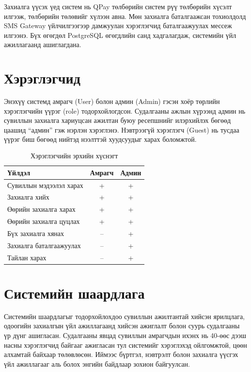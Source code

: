 Захиалга үүсэх үед систем нь QPay төлбөрийн систем рүү төлбөрийн хүсэлт илгээж, төлбөрийн төлөвийг хүлээн авна. Мөн захиалга баталгаажсан тохиолдолд SMS Gateway үйлчилгээгээр дамжуулан хэрэглэгчид баталгаажуулах мессеж илгээнэ. Бүх өгөгдөл PostgreSQL өгөгдлийн санд хадгалагдаж, системийн үйл ажиллагаанд ашиглагдана.


\section{Хэрэглэгчид}

Энэхүү системд амрагч (User) болон админ (Admin) гэсэн хоёр төрлийн хэрэглэгчийн үүрэг (role) тодорхойлогдсон. Судалгааны ажлын хүрээнд админ нь сувиллын захиалга хариуцсан ажилтан буюу ресепшнийг илэрхийлэх бөгөөд цаашид “админ” гэж нэрлэн хэрэглэнэ. 
Нэвтрээгүй хэрэглэгч (Guest) нь тусдаа үүрэг биш бөгөөд нийтэд нээлттэй хуудсуудыг харах боломжтой.

\vspace{0.5cm}

\begin{table}[H]
  \centering
  \caption{Хэрэглэгчийн эрхийн хүснэгт}
  \label{tab:role-matrix}
  \begin{tabular}{|l|c|c|}
    \hline
    \textbf{Үйлдэл} & \textbf{Амрагч} & \textbf{Админ} \\
    \hline
    Сувиллын мэдээлэл харах  & + & + \\
    \hline
    Захиалга хийх            & + & + \\
    \hline
    Өөрийн захиалга харах    & + & + \\
    \hline
    Өөрийн захиалга цуцлах   & + & + \\
    \hline
    Бүх захиалга хянах       & -- & + \\
    \hline
    Захиалга баталгаажуулах  & -- & + \\
    \hline
    Тайлан харах             & -- & + \\
    \hline
  \end{tabular}
\end{table}



\section{Системийн шаардлага}

Системийн шаардлагыг тодорхойлохдоо сувиллын ажилтантай хийсэн ярилцлага, одоогийн захиалгын үйл ажиллагаанд хийсэн ажиглалт болон суурь судалгааны үр дүнг ашигласан. Судалгааны явцад сувиллын амрагчдын ихэнх нь 40-өөс дээш насны хэрэглэгчид байгааг ажигласан тул системийг хэрэглэхэд ойлгомжтой, цөөн алхамтай байхаар төлөвлөсөн. Иймээс бүртгэл, нэвтрэлт болон захиалга үүсгэх үйл ажиллагааг аль болох энгийн байдлаар зохион байгуулсан.

